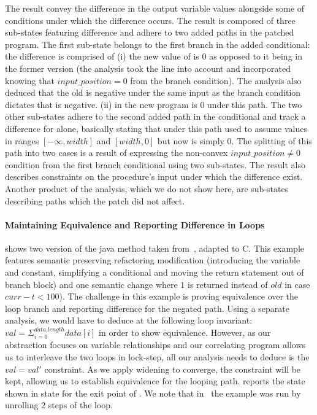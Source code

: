The result convey the difference in the output variable values alongside some of conditions under which the difference occurs. The result is composed of three sub-states featuring difference and adhere to two added paths in the patched program. The first sub-state belongs to the first branch in the added conditional: the difference is comprised of (i) the new value of  is 0 as opposed to it being  in the former version (the analysis took the  line into account and incorporated knowing that $input\_position = 0$ from the branch condition). The analysis also deduced that the old  is negative under the same input as the branch condition dictates that  is negative. (ii)  in the new program is 0 under this path. The two other sub-states adhere to the second added path in the conditional and track a difference for  alone, basically stating that  under this path used to assume values in ranges $[-\infty,width]$ and $[width,0]$ but now is simply 0. The splitting of this path into two cases is a result of expressing the non-convex $input\_position \neq 0$ condition from the first branch conditional using two sub-states. The result also describes constraints on the procedure's input under which the difference exist. Another product of the analysis, which we do not show here, are sub-states describing paths which the patch did not affect.

\paragraph{Maintaining Equivalence and Reporting Difference in Loops}


 shows two version of the java  method taken from~\cite{DwyerElbaumPerson08}, adapted to C. This example features semantic preserving refactoring modification (introducing the  variable and  constant, simplifying a conditional and moving the return statement out of branch block) and one semantic change where $1$ is returned instead of $old$ in case $curr - t < 100$). The challenge in this example is proving equivalence over the loop branch and reporting difference for the negated path. Using a separate analysis, we would have to deduce at the following loop invariant: $val = \Sigma_{i=0}^{data.length}data[i]$ in order to show equivalence. However, as our abstraction focuses on variable relationships and our correlating program allows us to interleave the two loops in lock-step, all our analysis needs to deduce is the $val = val'$ constraint. As we apply widening to converge, the constraint will be kept, allowing us to establish equivalence for the looping path. {\tool} reports the state shown in  state for the exit point of . We note that in~\cite{DwyerElbaumPerson08} the example was run  by unrolling 2 steps of the loop.

